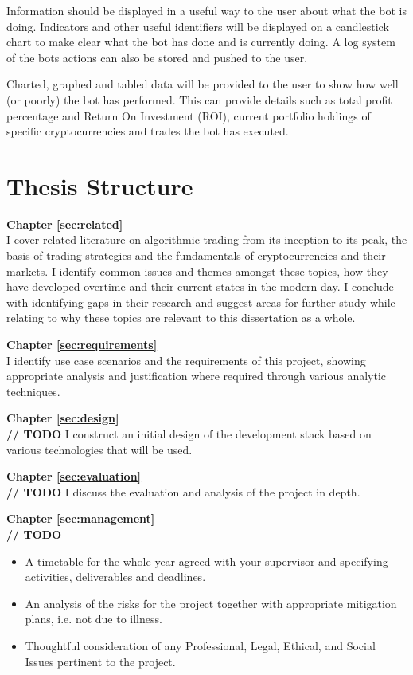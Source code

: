 Information should be displayed in a useful way to the user about what the bot is doing. Indicators and other useful identifiers will be displayed on a candlestick chart to make clear what the bot has done and is currently doing. A log system of the bots actions can also be stored and pushed to the user.

Charted, graphed and tabled data will be provided to the user to show how well (or poorly) the bot has performed. This can provide details such as total profit percentage and Return On Investment (ROI), current portfolio holdings of specific cryptocurrencies and trades the bot has executed.



\section{Thesis Structure}
\label{sec:intro:structure}

\noindent\textbf{Chapter \ref{sec:related}} \\[0.2em]
I cover related literature on algorithmic trading from its inception to its peak, the basis of trading strategies and the fundamentals of cryptocurrencies and their markets. I identify common issues and themes amongst these topics, how they have developed overtime and their current states in the modern day. I conclude with identifying gaps in their research and suggest areas for further study while relating to why these topics are relevant to this dissertation as a whole.

\noindent\textbf{Chapter \ref{sec:requirements}} \\[0.2em]
I identify use case scenarios and the requirements of this project, showing appropriate analysis and justification where required through various analytic techniques.

\noindent\textbf{Chapter \ref{sec:design}} \\[0.2em]
\textbf{// TODO}
I construct an initial design of the development stack based on various technologies that will be used.

\noindent\textbf{Chapter \ref{sec:evaluation}} \\[0.2em]
\textbf{// TODO}
I discuss the evaluation and analysis of the project in depth.

\noindent\textbf{Chapter \ref{sec:management}} \\[0.2em]
\textbf{// TODO}
\begin{itemize}
    \item A timetable for the whole year agreed with your supervisor and specifying activities, deliverables and deadlines.
    \item An analysis of the risks for the project together with appropriate mitigation plans, i.e. not due to illness.
    \item Thoughtful consideration of any Professional, Legal, Ethical, and Social Issues pertinent to the project.
\end{itemize}
